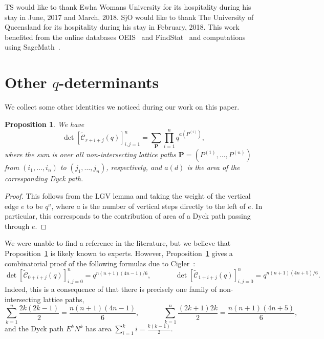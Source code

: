 \documentclass[11pt, leqno]{amsart}
\theoremstyle{plain}
\newtheorem{proposition}[theorem]{Proposition}
\theoremstyle{definition}
\numberwithin{equation}{section}
\newcommand{\Cat}{\mathcal{C}} %
\newcommand{\CatCR}{\widetilde{\Cat}} %
\newcommand{\nilp}{\mathbf{P}} %
\begin{document}
TS would like to thank Ewha Womans University for its hospitality during his stay in June, 2017 and March, 2018. SjO would like to thank The University of Queensland for its hospitality during his stay in February, 2018.
This work benefited from the online databases {\sc OEIS}~\cite{OEIS} and {\sc FindStat}~\cite{FindStat} and computations using {\sc SageMath}~\cite{sage,combinat}.







\appendix

\section{Other $q$-determinants}

We collect some other identities we noticed during our work on this paper.

\begin{proposition}
\label{prop:q_Catalan_Hankel}
We have
\[
\det \left[ \CatCR_{r+i+j}(q) \right]_{i,j=1}^n = \sum_{\nilp} \prod_{i=1}^n q^{a(P^{(i)})},
\]
where the sum is over all non-intersecting lattice paths $\nilp = (P^{(1)}, \dotsc, P^{(n)})$ from $(i_1, \dotsc, i_n)$ to $(j_1, \dotsc, j_n)$, respectively, and $a(d)$ is the area of the corresponding Dyck path.
\end{proposition}

\begin{proof}
This follows from the LGV lemma and taking the weight of the vertical edge $e$ to be $q^a$, where $a$ is the number of vertical steps directly to the left of $e$. In particular, this corresponds to the contribution of area of a Dyck path passing through $e$.
\end{proof}

We were unable to find a reference in the literature, but we believe that Proposition~\ref{prop:q_Catalan_Hankel} is likely known to experts.
However, Proposition~\ref{prop:q_Catalan_Hankel} gives a combinatorial proof of the following formulas due to Cigler~\cite{Cigler99}:
\[
\det \left[ \CatCR_{0+i+j}(q) \right]_{i,j=0}^n = q^{n(n+1)(4n-1)/6},
\hspace{40pt}
\det \left[ \CatCR_{1+i+j}(q) \right]_{i,j=0}^n = q^{n(n+1)(4n+5)/6}.
\]
Indeed, this is a consequence of that there is precisely one family of non-intersecting lattice paths,
\[
\sum_{k=1}^n \frac{2k(2k-1)}{2} = \frac{n(n+1)(4n-1)}{6},
\hspace{40pt}
\sum_{k=1}^n \frac{(2k+1)2k}{2} = \frac{n(n+1)(4n+5)}{6},
\]
and the Dyck path $E^k N^k$ has area $\sum_{i=1}^k i = \frac{k(k-1)}{2}$.
\end{document}
